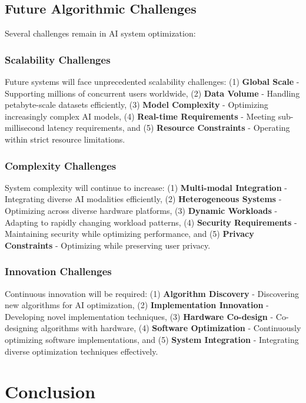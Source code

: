 \documentclass[conference]{IEEEtran}
\begin{document}
\subsection{Future Algorithmic Challenges}
Several challenges remain in AI system optimization:

\subsubsection{Scalability Challenges}
Future systems will face unprecedented scalability challenges: (1) \textbf{Global Scale} - Supporting millions of concurrent users worldwide, (2) \textbf{Data Volume} - Handling petabyte-scale datasets efficiently, (3) \textbf{Model Complexity} - Optimizing increasingly complex AI models, (4) \textbf{Real-time Requirements} - Meeting sub-millisecond latency requirements, and (5) \textbf{Resource Constraints} - Operating within strict resource limitations.

\subsubsection{Complexity Challenges}
System complexity will continue to increase: (1) \textbf{Multi-modal Integration} - Integrating diverse AI modalities efficiently, (2) \textbf{Heterogeneous Systems} - Optimizing across diverse hardware platforms, (3) \textbf{Dynamic Workloads} - Adapting to rapidly changing workload patterns, (4) \textbf{Security Requirements} - Maintaining security while optimizing performance, and (5) \textbf{Privacy Constraints} - Optimizing while preserving user privacy.

\subsubsection{Innovation Challenges}
Continuous innovation will be required: (1) \textbf{Algorithm Discovery} - Discovering new algorithms for AI optimization, (2) \textbf{Implementation Innovation} - Developing novel implementation techniques, (3) \textbf{Hardware Co-design} - Co-designing algorithms with hardware, (4) \textbf{Software Optimization} - Continuously optimizing software implementations, and (5) \textbf{System Integration} - Integrating diverse optimization techniques effectively.

\section{Conclusion}
\end{document}
